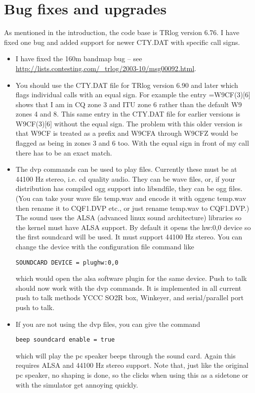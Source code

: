 \documentclass[12pt]{article}
\begin{document}
\section{Bug fixes and upgrades}
As mentioned in the introduction, the code base is TRlog version 6.76.
I have fixed one bug and added support for newer CTY.DAT with specific
call signs.
\begin{itemize}
\item
I have fixed the 160m bandmap bug -- see
\url{http://lists.contesting.com/_trlog/2003-10/msg00092.html}.
\item
You should use the CTY.DAT file for TRlog version 6.90 and later which
flags individual calls with an equal sign. For example the entry =W9CF(3)[6]
shows that I am in CQ zone 3 and ITU zone 6 rather than the default
W9 zones 4 and 8. This same entry in the
CTY.DAT file for earlier versions is W9CF(3)[6] without the equal sign. The
problem with this older version is that W9CF is treated as a prefix
and W9CFA through W9CFZ would be
flagged as being in zones 3 and 6 too. With the equal sign in front
of my call there has to be an exact match.
\item
The dvp commands can be used to play files. Currently
these must be at 44100 Hz stereo, i.e. cd quality
audio. They can
be wave files, or, if your distribution has compiled ogg support
into libsndfile, they can be ogg files. (You can take your
wave file temp.wav and encode it with oggenc temp.wav then rename
it to CQF1.DVP etc., or just rename temp.wav to CQF1.DVP.) The sound
uses the ALSA (advanced linux sound architecture)
libraries so
the kernel must have ALSA support. By default it opens the hw:0,0 device
so the first soundcard will be used. It must support 44100 Hz stereo.
You can change the device with the configuration file command like
\begin{verbatim}
SOUNDCARD DEVICE = plughw:0,0
\end{verbatim}
which would open the alsa software plugin for the same device.
Push to talk should now work with the dvp commands. It is implemented
in all current push to talk methods YCCC SO2R box, Winkeyer,
and serial/parallel port push to talk.
\item
If you are not using the dvp files, you can give the command
\begin{verbatim}
beep soundcard enable = true
\end{verbatim}
which will play the pc speaker beeps
through the sound card.
Again this requires ALSA and 44100 Hz stereo support.
Note that, just like the original pc speaker,
no shaping is done, so the clicks when using this as a sidetone or 
with the simulator get annoying quickly.


\end{itemize}
\end{document}

